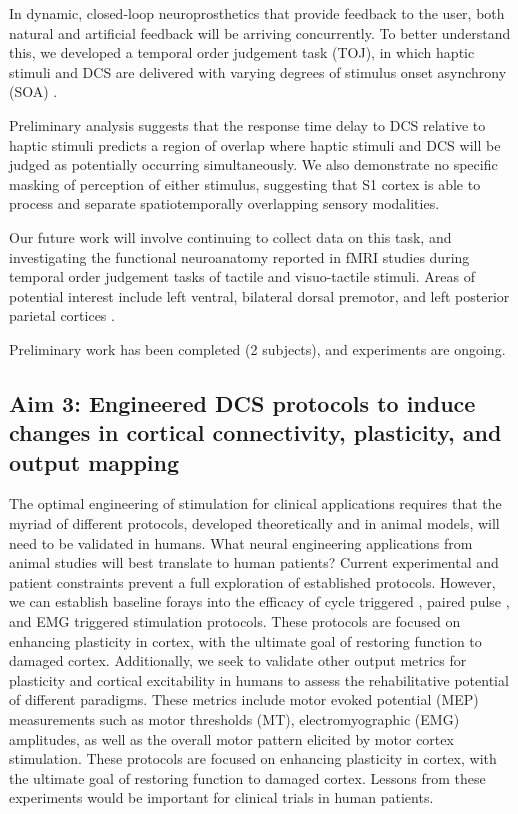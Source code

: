 In dynamic, closed-loop neuroprosthetics that provide feedback to the user, both natural and artificial feedback will be arriving concurrently. To better understand this, we developed a temporal order judgement task (TOJ), in which haptic stimuli and DCS are delivered with varying degrees of stimulus onset asynchrony (SOA) \cite{Miyazaki2016}.

Preliminary analysis suggests that the response time delay to DCS relative to haptic stimuli predicts a region of overlap where haptic stimuli and DCS will be judged as potentially occurring simultaneously. We also demonstrate no specific masking of perception of either stimulus, suggesting that S1 cortex is able to process and separate spatiotemporally overlapping sensory modalities. 

Our future work will involve continuing to collect data on this task, and investigating the functional neuroanatomy reported in fMRI studies during temporal order judgement tasks of tactile and visuo-tactile stimuli. Areas of potential interest include left ventral, bilateral dorsal premotor, and left posterior parietal cortices \cite{Miyazaki2016,Takahashi2013}.

Preliminary work has been completed (2 subjects), and experiments are ongoing. 

\subsection{Aim 3: Engineered DCS protocols to induce changes in cortical connectivity, plasticity, and output mapping }

The optimal engineering of stimulation for clinical applications requires that the myriad of different protocols, developed theoretically and in animal models, will need to be validated in humans. What neural engineering applications from animal studies will best translate to human patients? Current experimental and patient constraints prevent a full exploration of established protocols. However, we can establish baseline forays into the efficacy of cycle triggered \cite{Zanos2013}, paired pulse \cite{Seeman2017}, and EMG triggered \cite{Lucas2013} stimulation protocols. These protocols are focused on enhancing plasticity in cortex, with the ultimate goal of restoring function to damaged cortex. Additionally, we seek to validate other output metrics for plasticity and cortical excitability in humans to assess the rehabilitative potential of different paradigms. These metrics include motor evoked potential (MEP) measurements such as motor thresholds (MT), electromyographic (EMG) amplitudes, as well as the overall motor pattern elicited by motor cortex stimulation. These protocols are focused on enhancing plasticity in cortex, with the ultimate goal of restoring function to damaged cortex. Lessons from these experiments would be important for clinical trials in human patients. 

